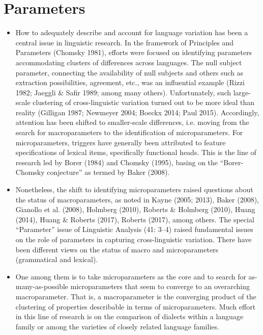\documentclass{article}
\begin{document}
\section{Parameters}
\begin{itemize}    
    \item How to adequately describe and account for language variation has been a central issue in linguistic research. In the framework of Principles and Parameters (Chomsky 1981), efforts were focused on identifying parameters accommodating clusters of differences across languages. The null subject parameter, connecting the availability of null subjects and others such as extraction possibilities, agreement, etc., was an influential example (Rizzi 1982; Jaeggli \& Safir 1989; among many others). Unfortunately, such large-scale clustering of cross-linguistic variation turned out to be more ideal than reality (Gilligan 1987; Newmeyer 2004; Boeckx 2014; Paul 2015). Accordingly, attention has been shifted to smaller-scale differences, i.e. moving from the search for macroparameters to the identification of microparameters. For microparameters, triggers have generally been attributed to feature specifications of lexical items, specifically functional heads. This is the line of research led by Borer (1984) and Chomsky (1995), basing on the “Borer-Chomsky conjecture” as termed by Baker (2008).
    \item Nonetheless, the shift to identifying microparameters raised questions about the status of macroparameters, as noted in Kayne (2005; 2013), Baker (2008), Gianollo et al. (2008), Holmberg (2010), Roberts \& Holmberg (2010), Huang (2014), Huang \& Roberts (2017), Roberts (2017), among others. The special “Parameter” issue of Linguistic Analysis (41: 3–4) raised fundamental issues on the role of parameters in capturing cross-linguistic variation. There have been different views on the status of macro and microparameters (grammatical and lexical). 
    \item One among them is to take microparameters as the core and to search for as-many-as-possible microparameters that seem to converge to an overarching macroparameter. That is, a macroparameter is the converging product of the clustering of properties describable in terms of microparameters. Much effort in this line of research is on the comparison of dialects within a language family or among the varieties of closely related language families. 

\end{itemize}
\end{document}
